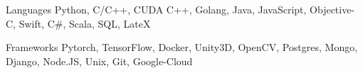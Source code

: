
\begin{cvskills}
  \cvskill
    {Languages} %
    {Python, C/C++, CUDA C++, Golang, Java, JavaScript, Objective-C, Swift, C\#, Scala, SQL, LateX} %

  \cvskill
    {Frameworks} %
    {Pytorch, TensorFlow, Docker, Unity3D, OpenCV, Postgres, Mongo, Django, Node.JS, Unix, Git, Google-Cloud} %
\end{cvskills}
